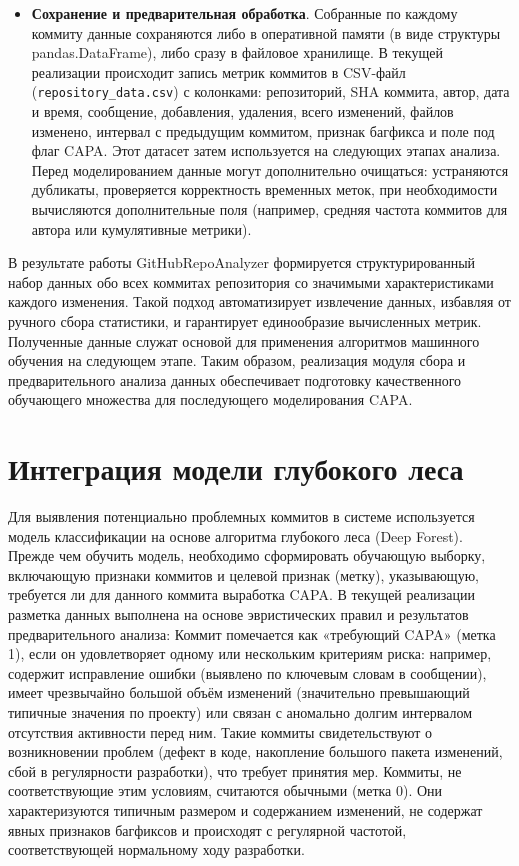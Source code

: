\begin{itemize}
	\item \textbf{Сохранение и предварительная обработка}. Собранные по каждому коммиту данные сохраняются либо в оперативной памяти (в виде структуры pandas.DataFrame), либо сразу в файловое хранилище. В текущей реализации происходит запись метрик коммитов в CSV-файл (\verb|repository_data.csv|) с колонками: репозиторий, SHA коммита, автор, дата и время, сообщение, добавления, удаления, всего изменений, файлов изменено, интервал с предыдущим коммитом, признак багфикса и поле под флаг CAPA. Этот датасет затем используется на следующих этапах анализа. Перед моделированием данные могут дополнительно очищаться: устраняются дубликаты, проверяется корректность временных меток, при необходимости вычисляются дополнительные поля (например, средняя частота коммитов для автора или кумулятивные метрики).
\end{itemize}

В результате работы GitHubRepoAnalyzer формируется структурированный набор данных обо всех коммитах репозитория со значимыми характеристиками каждого изменения. Такой подход автоматизирует извлечение данных, избавляя от ручного сбора статистики, и гарантирует единообразие вычисленных метрик. Полученные данные служат основой для применения алгоритмов машинного обучения на следующем этапе. Таким образом, реализация модуля сбора и предварительного анализа данных обеспечивает подготовку качественного обучающего множества для последующего моделирования CAPA.


\section{Интеграция модели глубокого леса} \label{ch3:sec3}

Для выявления потенциально проблемных коммитов в системе используется модель классификации на основе алгоритма глубокого леса (Deep Forest). Прежде чем обучить модель, необходимо сформировать обучающую выборку, включающую признаки коммитов и целевой признак (метку), указывающую, требуется ли для данного коммита выработка CAPA. В текущей реализации разметка данных выполнена на основе эвристических правил и результатов предварительного анализа:
Коммит помечается как «требующий CAPA» (метка 1), если он удовлетворяет одному или нескольким критериям риска: например, содержит исправление ошибки (выявлено по ключевым словам в сообщении), имеет чрезвычайно большой объём изменений (значительно превышающий типичные значения по проекту) или связан с аномально долгим интервалом отсутствия активности перед ним. Такие коммиты свидетельствуют о возникновении проблем (дефект в коде, накопление большого пакета изменений, сбой в регулярности разработки), что требует принятия мер.
Коммиты, не соответствующие этим условиям, считаются обычными (метка 0). Они характеризуются типичным размером и содержанием изменений, не содержат явных признаков багфиксов и происходят с регулярной частотой, соответствующей нормальному ходу разработки.


